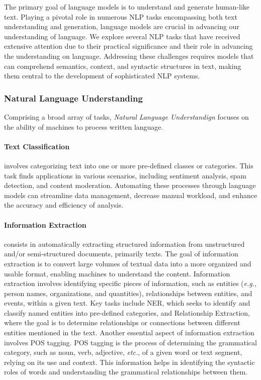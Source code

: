 The primary goal of language models is to understand and generate human-like text. Playing a pivotal role in numerous \ac{NLP} tasks encompassing both text understanding and generation, language models are crucial in advancing our understanding of language. We explore several \ac{NLP} tasks that have received extensive attention due to their practical significance and their role in advancing the understanding on language. Addressing these challenges requires models that can comprehend semantics, context, and syntactic structures in text, making them central to the development of sophisticated \ac{NLP} systems.

\subsubsection{Natural Language Understanding}

Comprising a broad array of tasks, \textit{Natural Language Understandign} focuses on the ability of machines to process written language. 

\paragraph{Text Classification} involves categorizing text into one or more pre-defined classes or categories. This task finds applications in various scenarios, including sentiment analysis, spam detection, and content moderation. Automating these processes through language models can streamline data management, decrease manual workload, and enhance the accuracy and efficiency of analysis. 

\paragraph{Information Extraction} consists in automatically extracting structured information from unstructured and/or semi-structured documents, primarily texts. The goal of information extraction is to convert large volumes of textual data into a more organized and usable format, enabling machines to  understand the content. Information extraction involves identifying specific pieces of information, such as entities (\textit{e.g.}, person names, organizations, and quantities), relationships between entities, and events, within a given text. Key tasks include \ac{NER}, which seeks to identify and classify named entities into pre-defined categories, and Relationship Extraction, where the goal is to determine relationships or connections between different entities mentioned in the text. Another essential aspect of information extraction involves \ac{POS} tagging. \ac{POS} tagging is the process of determining the grammatical category, such as noun, verb, adjective, \textit{etc.}, of a given word or text segment, relying on its use and context. This information helps in identifying the syntactic roles of words and understanding the grammatical relationships between them.

